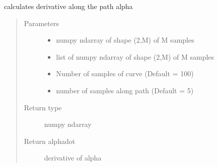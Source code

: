 \documentclass[letterpaper,10pt,english]{sphinxmanual}
\begin{document}
\begin{fulllineitems}
\label{\detokenize{geodesic:geodesic.calc_alphadot}}
calculates derivative along the path alpha
\begin{quote}\begin{description}
\item[{Parameters}] \leavevmode\begin{itemize}
\item {} 
 \textendash{} numpy ndarray of shape (2,M) of M samples

\item {} 
 \textendash{} list of numpy ndarray of shape (2,M) of M samples

\item {} 
 \textendash{} Number of samples of curve (Default = 100)

\item {} 
 \textendash{} number of samples along path (Default = 5)

\end{itemize}

\item[{Return type}] \leavevmode
numpy ndarray

\item[{Return alphadot}] \leavevmode
derivative of alpha

\end{description}\end{quote}

\end{fulllineitems}

\end{document}
